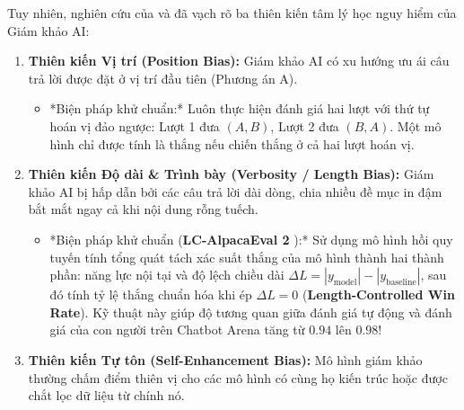 Tuy nhiên, nghiên cứu của \citet{zheng2023judging} và \citet{dubois2024length} đã vạch rõ ba thiên kiến tâm lý học nguy hiểm của Giám khảo AI:
\begin{enumerate}[leftmargin=1.2cm]
    \item \textbf{Thiên kiến Vị trí (Position Bias):} Giám khảo AI có xu hướng ưu ái câu trả lời được đặt ở vị trí đầu tiên (Phương án A).
    \begin{itemize}
        \item *Biện pháp khử chuẩn:* Luôn thực hiện đánh giá hai lượt với thứ tự hoán vị đảo ngược: Lượt 1 đưa $(A, B)$, Lượt 2 đưa $(B, A)$. Một mô hình chỉ được tính là thắng nếu chiến thắng ở cả hai lượt hoán vị.
    \end{itemize}
    \item \textbf{Thiên kiến Độ dài \& Trình bày (Verbosity / Length Bias):} Giám khảo AI bị hấp dẫn bởi các câu trả lời dài dòng, chia nhiều đề mục in đậm bắt mắt ngay cả khi nội dung rỗng tuếch.
    \begin{itemize}
        \item *Biện pháp khử chuẩn (\textbf{LC-AlpacaEval 2} \citealt{dubois2024length}):* Sử dụng mô hình hồi quy tuyến tính tổng quát tách xác suất thắng của mô hình thành hai thành phần: năng lực nội tại và độ lệch chiều dài $\Delta L = |y_{\text{model}}| - |y_{\text{baseline}}|$, sau đó tính tỷ lệ thắng chuẩn hóa khi ép $\Delta L = 0$ (\textbf{Length-Controlled Win Rate}). Kỹ thuật này giúp độ tương quan giữa đánh giá tự động và đánh giá của con người trên Chatbot Arena tăng từ $0.94$ lên $0.98$!
    \end{itemize}
    \item \textbf{Thiên kiến Tự tôn (Self-Enhancement Bias):} Mô hình giám khảo thường chấm điểm thiên vị cho các mô hình có cùng họ kiến trúc hoặc được chắt lọc dữ liệu từ chính nó.
\end{enumerate}

